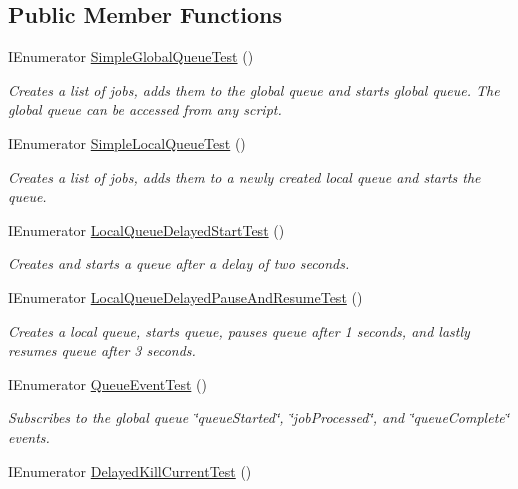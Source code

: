 \subsection*{Public Member Functions}
\begin{DoxyCompactItemize}
\item 
I\+Enumerator \hyperlink{class_example_job_queue_test_a45a4cc204d6396b39b6ff3844c4dbc2f}{Simple\+Global\+Queue\+Test} ()
\begin{DoxyCompactList}\small\item\em Creates a list of jobs, adds them to the global queue and starts global queue. The global queue can be accessed from any script. \end{DoxyCompactList}\item 
I\+Enumerator \hyperlink{class_example_job_queue_test_a65d6aaf0f94ba848ce1be82a6d90e780}{Simple\+Local\+Queue\+Test} ()
\begin{DoxyCompactList}\small\item\em Creates a list of jobs, adds them to a newly created local queue and starts the queue. \end{DoxyCompactList}\item 
I\+Enumerator \hyperlink{class_example_job_queue_test_abe5f18a717e6699715d829f8fe797da5}{Local\+Queue\+Delayed\+Start\+Test} ()
\begin{DoxyCompactList}\small\item\em Creates and starts a queue after a delay of two seconds. \end{DoxyCompactList}\item 
I\+Enumerator \hyperlink{class_example_job_queue_test_a1463e2c77a6e293cb5d1a596a970d405}{Local\+Queue\+Delayed\+Pause\+And\+Resume\+Test} ()
\begin{DoxyCompactList}\small\item\em Creates a local queue, starts queue, pauses queue after 1 seconds, and lastly resumes queue after 3 seconds. \end{DoxyCompactList}\item 
I\+Enumerator \hyperlink{class_example_job_queue_test_ac09ae706637551c37837a36d951fbac6}{Queue\+Event\+Test} ()
\begin{DoxyCompactList}\small\item\em Subscribes to the global queue \char`\"{}queue\+Started\char`\"{}, \char`\"{}job\+Processed\char`\"{}, and \char`\"{}queue\+Complete\char`\"{} events. \end{DoxyCompactList}\item 
I\+Enumerator \hyperlink{class_example_job_queue_test_a56d063006d12236d417219ae1711706b}{Delayed\+Kill\+Current\+Test} ()

\end{DoxyCompactItemize}
